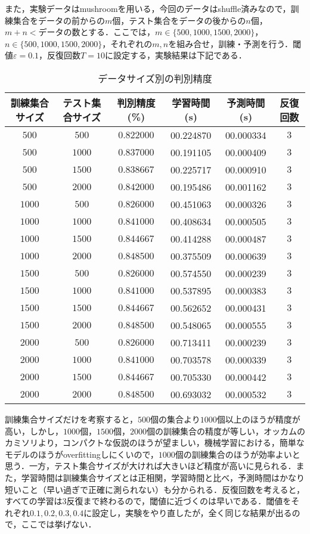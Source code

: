 \documentclass[a4paper,11pt]{jsarticle}
\numberwithin{theorem}{section}  %
\numberwithin{equation}{section} %
\begin{document}
また，実験データはmushroomを用いる，今回のデータはshuffle済みなので，訓練集合をデータの前からの$m$個，テスト集合をデータの後からの$n$個，$m+n<\text{データの数}$とする．ここでは，$m\in\{500,1000,1500,2000\}$，$n\in\{500, 1000, 1500, 2000\}$，それぞれの$m,n$を組み合せ，訓練・予測を行う．閾値$\varepsilon=0.1$，反復回数$T=10$に設定する，実験結果は下記である．
\begin{table}[htdp]
\caption{データサイズ別の判別精度}
\begin{center}
\begin{tabular}{|c|c|c|c|c|c|}
\hline
訓練集合サイズ&テスト集合サイズ& 判別精度(\%) & 学習時間(s) & 予測時間(s) & 反復回数\\
\hline
$500$ & $500$ & $0.822000$ & 00.224870 & 00.000334 & $3$\\
$500$ & $1000$ & $0.837000$ & 00.191105 & 00.000409 & $3$\\
$500$ & $1500$ & $0.838667$ & 00.225717 & 00.000910 & $3$\\
$500$ & $2000$ & $0.842000$ & 00.195486 & 00.001162 & $3$\\
\hline
$1000$ & $500$ & $0.826000$ & 00.451063 & 00.000326 & $3$\\
$1000$ & $1000$ & $0.841000$ & 00.408634 & 00.000505 & $3$\\
$1000$ & $1500$ & $0.844667$ & 00.414288 & 00.000487 & $3$\\
$1000$ & $2000$ & $0.848500$ & 00.375509 & 00.000639 & $3$\\
\hline
$1500$ & $500$ & $0.826000$ & 00.574550 & 00.000239 & $3$\\
$1500$ & $1000$ & $0.841000$ & 00.537895 & 00.000383 & $3$\\
$1500$ & $1500$ & $0.844667$ & 00.562652 & 00.000431 & $3$\\
$1500$ & $2000$ & $0.848500$ & 00.548065 & 00.000555 & $3$\\
\hline
$2000$ & $500$ & $0.826000$ & 00.713411 & 00.000239 & $3$\\
$2000$ & $1000$ & $0.841000$ & 00.703578 & 00.000339 & $3$\\
$2000$ & $1500$ & $0.844667$ & 00.705330 & 00.000442 & $3$\\
$2000$ & $2000$ & $0.848500$ & 00.693032 & 00.000532 & $3$\\
\hline
\end{tabular}
\end{center}
\label{default}
\end{table}

訓練集合サイズだけを考察すると，$500$個の集合より$1000$個以上のほうが精度が高い，しかし，$1000$個，$1500$個，$2000$個の訓練集合の精度が等しい，オッカムのカミソリより，コンパクトな仮説のほうが望ましい，機械学習における，簡単なモデルのほうがoverfittingしにくいので，$1000$個の訓練集合のほうが効率よいと思う．一方，テスト集合サイズが大ければ大きいほど精度が高いに見られる．また，学習時間は訓練集合サイズとは正相関，学習時間と比べ，予測時間はかなり短いこと（早い過ぎで正確に測られない）も分かられる．反復回数を考えると，すべての学習は$3$反復まで終わるので，閾値に近づくのは早いである．閾値をそれぞれ$0.1,0.2,0.3,0.4$に設定し，実験をやり直したが，全く同じな結果が出るので，ここでは挙げない．
\end{document}
